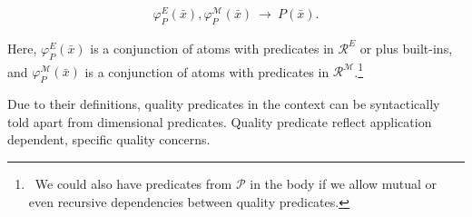 \documentclass[format=acmsmall, review=false, screen=true]{acmart}
\newcommand{\ignore}[1]{}
\newcommand{\mc}[1]{\mathcal{ #1}}
\newcommand{\nit}[1]{{\it #1}}
\newcommand{\bl}[1]{#1}
\newcommand{\vectt}[1]{\bar{#1}}
\newcommand{\red}[1]{{#1}}
\newcommand{\blue}[1]{{#1}}
\newcommand{\comlb}[1]{{\vspace{2mm}\noindent \bf \blue{COMM(LEO):}}~ #1 \hfill {\bf
    END.}\\}
\newcommand{\commos}[1]{{\vspace{2mm}\noindent \bf \blue{COMM(MOSTAFA):}}~ #1 \hfill {\bf
    END.}\\}
\begin{document}
\begin{enumerate}[(a)]
\vspace{-4mm}
\begin{align}
\varphi_P^E(\vectt{x}),\varphi^\mc{M}_P(\vectt{x})~\rightarrow~P(\vectt{x}).\label{frm:qpd}
\end{align}
\vspace{-4mm}

\noindent Here, $\varphi_P^E(\vectt{x})$ is a conjunction of atoms with predicates in \bl{$\mc{R}^E$} or plus built-ins, and $\varphi^\mc{M}_P(\vectt{x})$ is a conjunction of atoms with predicates in $\mc{R}^\mc{M}$.\footnote{\ We could also have predicates from $\mc{P}$ in the body if we allow mutual or even recursive dependencies between quality predicates.}

Due to their definitions, quality predicates in the context can be syntactically told apart from dimensional predicates. Quality predicate reflect application dependent, specific quality concerns.
\end{enumerate}

\ignore{
 \comlb{You had an example in the middle of the def. of quality predicates saying ``... in terms of predicates  (\red{e.g.} \nit{WorkingScheduels} and \nit{Personnel} in Example~\ref{ex:case})". Put all that in the example.}
\comlb{This is good place to start with the running example, illustrating what we have so far.}
\commos{Here is the example about the elements 1-4 in the context.}
}
\end{document}
